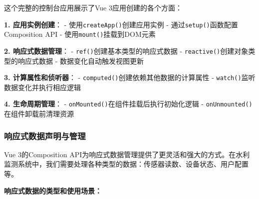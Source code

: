 \begin{Shaded}
\begin{Highlighting}[]
 \OperatorTok{=} 
\VerbatimStringTok{        \}}
\VerbatimStringTok{        }
\end{Highlighting}
\end{Shaded}

这个完整的控制台应用展示了Vue 3应用创建的各个方面：

\textbf{1. 应用实例创建}： - 使用\texttt{createApp()}创建应用实例 - 通过\texttt{setup()}函数配置Composition API - 使用\texttt{mount()}挂载到DOM元素

\textbf{2. 响应式数据管理}： - \texttt{ref()}创建基本类型的响应式数据 - \texttt{reactive()}创建对象类型的响应式数据 - 数据变化自动触发视图更新

\textbf{3. 计算属性和侦听器}： - \texttt{computed()}创建依赖其他数据的计算属性 - \texttt{watch()}监听数据变化并执行相应逻辑

\textbf{4. 生命周期管理}： - \texttt{onMounted()}在组件挂载后执行初始化逻辑 - \texttt{onUnmounted()}在组件卸载前清理资源

\subsubsection{响应式数据声明与管理}\label{ux54cdux5e94ux5f0fux6570ux636eux58f0ux660eux4e0eux7ba1ux7406}

Vue 3的Composition API为响应式数据管理提供了更灵活和强大的方式。在水利监测系统中，我们需要处理各种类型的数据：传感器读数、设备状态、用户配置等。

\textbf{响应式数据的类型和使用场景：}

